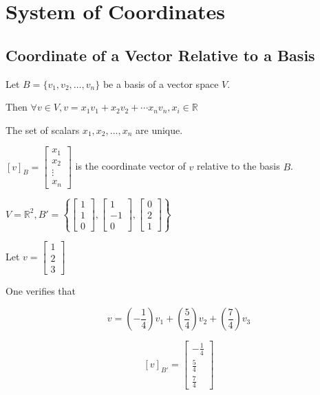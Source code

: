 \chapter{System of Coordinates}

\section{Coordinate of a Vector Relative to a Basis}

Let $B = \{v_1, v_2,\ldots,v_n\}$ be a basis of a vector space $V$.

Then $\forall v \in V, v = x_1 v_1 + x_2 v_2 + \cdots x_n v_n, x_i \in \mathbb{R}$

The set of scalars $x_1, x_2, \ldots, x_n$ are unique.

\begin{definition}
	$[v]_B = \begin{bmatrix}
		x_1\\x_2\\\vdots\\x_n
	\end{bmatrix}$ is the coordinate vector of $v$ relative to the basis $B$.
\end{definition}

\begin{example}
	$V = \mathbb{R}^2, B' = \left\{
		\begin{bmatrix}
			1\\1\\0
		\end{bmatrix}, \begin{bmatrix}
			1\\-1\\0
		\end{bmatrix}, \begin{bmatrix}
			0\\2\\1
		\end{bmatrix}
	\right\}$

	Let $v = \begin{bmatrix}
		1\\2\\3
	\end{bmatrix}$

	One verifies that 

	\[v = \left(-\frac{1}{4}\right)v_1 + \left(\frac{5}{4}\right)v_2 + \left(\frac{7}{4}\right)v_3\]

	\[[v]_{B'} = \begin{bmatrix}
		-\frac{1}{4}\\\frac{5}{4}\\\frac{7}{4}
	\end{bmatrix}\]
\end{example}

